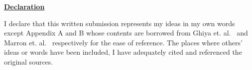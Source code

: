 \vspace*{5cm}
\begin{center}
\underline{\textbf{Declaration}}
\end{center}

I declare that this written submission represents my ideas in my own 
words except Appendix A and B whose contents are borrowed from Ghiya et. al.~\cite{Ghiya96} and Marron et. al.~\cite{marron06static} respectively for the 
ease of reference. The places where others' ideas or words have been included, I have adequately cited and 
referenced the original sources.
\newpage

